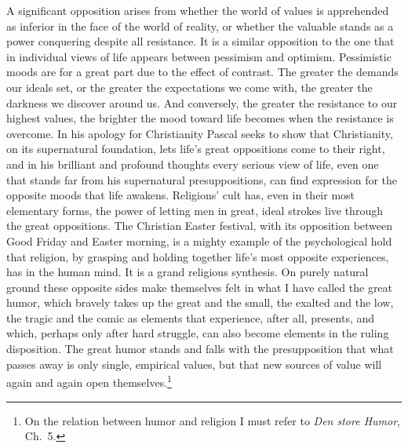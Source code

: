\documentclass[12pt]{book}
\newcommand{\opage}[1]{\marginnote{\footnotesize\textit{[#1]}}}
\begin{document}
A significant opposition arises from whether the world of values is apprehended as inferior in the face of the
world of reality, or whether the valuable stands as a power conquering despite all resistance. It is a
similar opposition to the one that in individual views of life appears between pessimism and optimism.
Pessimistic moods are for a great part due to the effect of contrast. The greater the demands our ideals set,
or the greater the expectations we come with, the greater the darkness we discover around us. And conversely,
the greater the resistance to our highest values, the brighter the mood toward life becomes when the
resistance is overcome. In his apology for Christianity Pascal seeks to show that Christianity, on its
supernatural foundation, lets life's great oppositions come to their right, and in his brilliant and profound
thoughts every serious view of life, even one that stands far from his supernatural presuppositions, can find
expression for the opposite moods that life awakens. Religions' cult has, even in their most elementary forms,
the power of letting men in great, ideal strokes live through the great oppositions. The Christian Easter
festival, with its opposition between Good Friday and Easter morning, is a mighty example of the psychological
hold that religion, by grasping and holding together life's most opposite experiences, has in the human mind.
It is a grand religious synthesis. On purely natural ground these opposite sides make themselves felt in what
I have called the great humor, which bravely takes up the great and the small, the exalted and the low, the
tragic and the comic as elements that experience, after all, presents, and which, perhaps only after hard
struggle, can also become \opage{112}elements in the ruling disposition. The great humor stands and falls with the
presupposition that what passes away is only single, empirical values, but that new sources of value will
again and again open themselves.\footnote{On the relation between humor and religion I must refer to
\textit{Den store Humor}, Ch.\ 5.}
\end{document}
